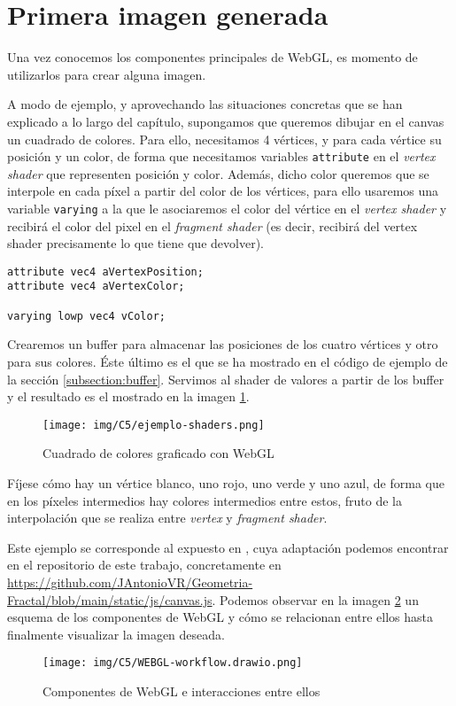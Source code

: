 \section{Primera imagen generada}

Una vez conocemos los componentes principales de WebGL, es momento de utilizarlos para crear alguna imagen.

A modo de ejemplo, y aprovechando las situaciones concretas que se han explicado a lo largo del capítulo, supongamos que queremos dibujar en el canvas un cuadrado de colores. Para ello, necesitamos 4 vértices, y para cada vértice su posición y un color, de forma que necesitamos variables \verb|attribute| en el \textit{vertex shader} que representen posición y color. Además, dicho color queremos que se interpole en cada píxel a partir del color de los vértices, para ello usaremos una variable \verb|varying| a la que le asociaremos el color del vértice en el \textit{vertex shader} y recibirá el color del pixel en el \textit{fragment shader} (es decir, recibirá del vertex shader precisamente lo que tiene que devolver).
\begin{lstlisting}
attribute vec4 aVertexPosition;
attribute vec4 aVertexColor;

varying lowp vec4 vColor;
\end{lstlisting}

Crearemos un buffer para almacenar las posiciones de los cuatro vértices y otro para sus colores. Éste último es el que se ha mostrado en el código de ejemplo de la sección \ref{subsection:buffer}. Servimos al shader de valores a partir de los buffer y el resultado es el mostrado en la imagen \ref{fig:ejemplo-wgl}.

\begin{figure} [ht]
    \centering
    \texttt{[image: img/C5/ejemplo-shaders.png]}
    \caption{Cuadrado de colores graficado con WebGL}
    \label{fig:ejemplo-wgl}
\end{figure}

Fíjese cómo hay un vértice blanco, uno rojo, uno verde y uno azul, de forma que en los píxeles intermedios hay colores intermedios entre estos, fruto de la interpolación que se realiza entre \textit{vertex} y \textit{fragment shader}.

Este ejemplo se corresponde al expuesto en \cite{MDN-1}, cuya adaptación podemos encontrar en el repositorio de este trabajo, concretamente en \url{https://github.com/JAntonioVR/Geometria-Fractal/blob/main/static/js/canvas.js}. Podemos observar en la imagen \ref{fig:componentes-wgl} un esquema de los componentes de WebGL y cómo se relacionan entre ellos hasta finalmente visualizar la imagen deseada.



\begin{figure} [ht]
    \centering
    \texttt{[image: img/C5/WEBGL-workflow.drawio.png]}
    \caption{Componentes de WebGL e interacciones entre ellos}
    \label{fig:componentes-wgl}
\end{figure}


